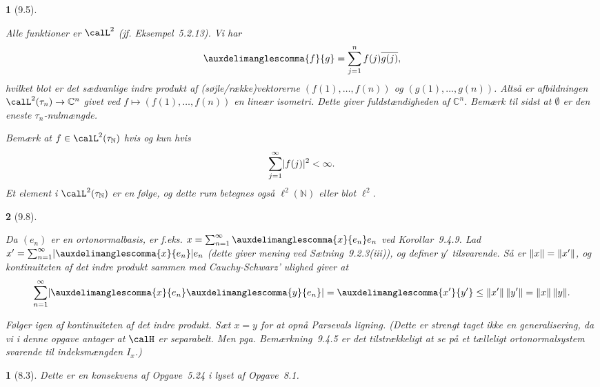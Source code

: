 \documentclass[a4paper, 11pt, article, danish, oneside]{memoir}
\newcommand{\naturals}{\mathbb{N}}
\newcommand{\complex}{\mathbb{C}}
\newcommand{\blank}{\mathrel{\;\cdot\;}}
\newcommand{\blankifempty}[1]{\ifstrempty{#1}{\blank}{#1}}
\DeclarePairedDelimiter{\auxdelimlvert}{\lvert}{\rvert}
\DeclarePairedDelimiter{\auxdelimlVert}{\lVert}{\rVert}
\newcommand{\abs}[2][]{\auxdelimlvert[#1]{\blankifempty{#2}}}
\newcommand{\norm}[1]{\auxdelimlVert{\blankifempty{#1}}}
\newcommand{\inner}[2]{\auxdelimanglescomma{\blankifempty{#1}}{\blankifempty{#2}}}
\newcommand{\pencilsymbol}{\raisebox{-2pt}{\normalfont\PencilLeft}}
\theoremstyle{changedotcustomnumber}
\newtheorem{opgave}{\pencilsymbol}
\theoremstyle{changedotbreakcustomnumber}
\newtheorem{opgavebreak}{\pencilsymbol}
\begin{document}
\begin{opgavebreak}[9.5]
\begin{solutionsec}
    \item Alle funktioner er $\calL^2$ (jf. Eksempel~5.2.13). Vi har
    \begin{equation*}
        \inner{f}{g}
            = \sum_{j=1}^n f(j) \overline{g(j)},
    \end{equation*}
    hvilket blot er det sædvanlige indre produkt af (søjle/række)vektorerne $(f(1), \ldots, f(n))$ og $(g(1), \ldots, g(n))$. Altså er afbildningen $\calL^2(\tau_n) \to \complex^n$ givet ved $f \mapsto (f(1), \ldots, f(n))$ en lineær isometri. Dette giver fuldstændigheden af $\complex^n$. Bemærk til sidst at $\emptyset$ er den eneste $\tau_n$-nulmængde.

    \item Bemærk at $f \in \calL^2(\tau_\naturals)$ hvis og kun hvis
    \begin{equation*}
        \sum_{j=1}^\infty \abs{f(j)}^2
            < \infty.
    \end{equation*}
    Et element i $\calL^2(\tau_\naturals)$ er en følge, og dette rum betegnes også $\ell^2(\naturals)$ eller blot $\ell^2$.
\end{solutionsec}
\end{opgavebreak}


\begin{opgavebreak}[9.8]
\begin{solutionsec}
    \item Da $(e_n)$ er en ortonormalbasis, er f.eks. $x = \sum_{n=1}^\infty \inner{x}{e_n} e_n$ ved Korollar~9.4.9. Lad $x' = \sum_{n=1}^\infty \abs{\inner{x}{e_n}} e_n$ (dette giver mening ved Sætning~9.2.3(iii)), og definer $y'$ tilsvarende. Så er $\norm{x} = \norm{x'}$, og kontinuiteten af det indre produkt sammen med Cauchy-Schwarz' ulighed giver at
    \begin{equation*}
        \sum_{n=1}^\infty \abs{\inner{x}{e_n} \inner{y}{e_n}}
            = \inner{x'}{y'}
            \leq \norm{x'} \, \norm{y'}
            = \norm{x} \, \norm{y}.
    \end{equation*}

    \item Følger igen af kontinuiteten af det indre produkt. Sæt $x = y$ for at opnå Parsevals ligning. (Dette er strengt taget ikke en generalisering, da vi i denne opgave antager at $\calH$ er \emph{separabelt}. Men pga. Bemærkning~9.4.5 er det tilstrækkeligt at se på et tælleligt ortonormalsystem svarende til indeksmængden $I_x$.)
\end{solutionsec}
\end{opgavebreak}


\begin{opgave}[8.3]
    Dette er en konsekvens af Opgave~5.24 i lyset af Opgave~8.1.
\end{opgave}
\end{document}
